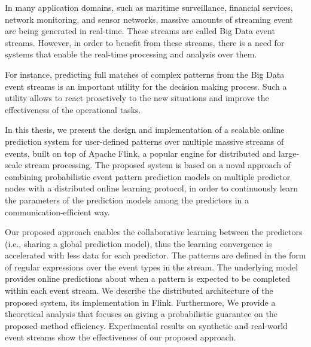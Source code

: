 
\par In many application domains, such as maritime surveillance, financial services, network monitoring, and sensor networks, massive amounts of streaming event are being generated in real-time. These streams are called Big Data event streams.  However, in order to benefit from these streams, there is a need for systems that enable the real-time processing and analysis over them.


 
 For instance, predicting full matches of complex patterns from the Big Data event streams is an important utility for the decision making process. Such a utility allows to react proactively to the new situations and improve the effectiveness of the operational tasks.

\par In this thesis, we present the design and implementation of a scalable online prediction system for user-defined patterns over multiple massive streams of events, built on top of Apache Flink, a popular engine for distributed and large-scale stream processing. The proposed system is based on a noval approach of combining probabilistic event pattern prediction models on multiple predictor nodes with a distributed online learning protocol, in order to continuously learn the parameters of the prediction models among the predictors in a communication-efficient way. 

\par  Our proposed approach enables the collaborative learning between the predictors (i.e., sharing a global prediction model), thus the learning convergence is accelerated with less data for each predictor. The patterns are defined in the form of regular expressions over the event types in the stream. The underlying model provides online predictions about when a pattern is expected to be completed within each event stream. We describe the distributed architecture of the proposed system, its implementation in Flink.  Furthermore, We provide a theoretical analysis that focuses on giving a probabilistic guarantee on the proposed method efficiency.  Experimental results on synthetic and real-world event streams show the effectiveness of our proposed approach.

